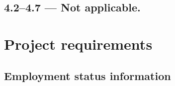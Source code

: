 \documentclass{dfg_en}
\newcommand{\emptyheading}{ \mdseries--- Not applicable.}
\begin{document}
\subsection*{4.2--4.7\emptyheading}

%
%
%
%
%


\section{Project requirements}

\subsection{Employment status information}

\end{document}
